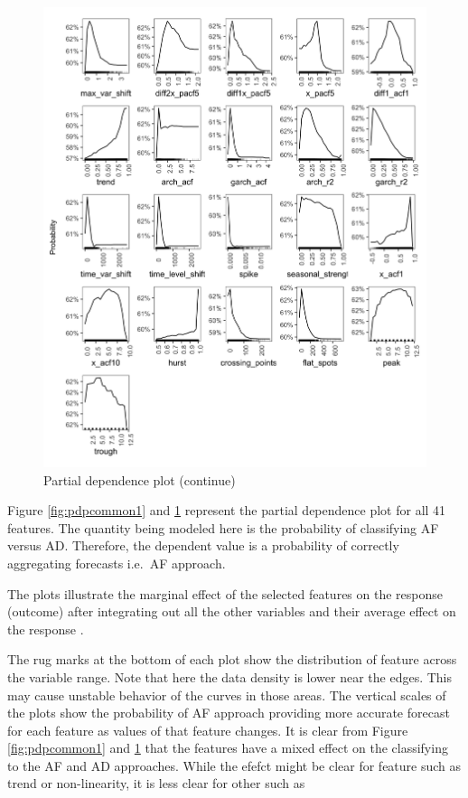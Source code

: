 \documentclass[]{elsarticle} %
\begin{document}
\begin{figure}[H]

{\centering \includegraphics[width=1\linewidth]{img/300dpi/pfinal1} 

}

\caption{Partial dependence plot (continue)}\label{fig:pdpcommon2}
\end{figure}

Figure \ref{fig:pdpcommon1} and \ref{fig:pdpcommon2} represent the
partial dependence plot for all 41 features. The quantity being modeled
here is the probability of classifying AF versus AD. Therefore, the
dependent value is a probability of correctly aggregating forecasts
i.e.~AF approach.

The plots illustrate the marginal effect of the selected features on the
response (outcome) after integrating out all the other variables and
their average effect on the response \citep{james2013introduction}.

The rug marks at the bottom of each plot show the distribution of
feature across the variable range. Note that here the data density is
lower near the edges. This may cause unstable behavior of the curves in
those areas. The vertical scales of the plots show the probability of AF
approach providing more accurate forecast for each feature as values of
that feature changes. It is clear from Figure \ref{fig:pdpcommon1} and
\ref{fig:pdpcommon2} that the features have a mixed effect on the
classifying to the AF and AD approaches. While the efefct might be clear
for feature such as trend or non-linearity, it is less clear for other
such as
\end{document}
